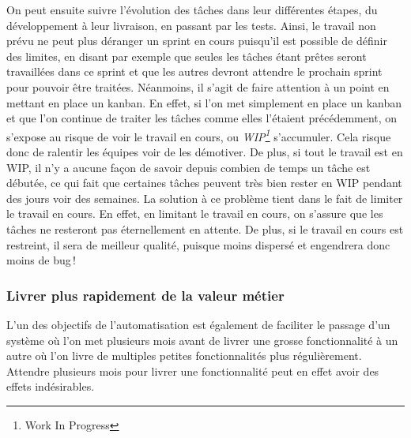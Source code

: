 On peut ensuite suivre l'évolution des tâches dans leur différentes étapes, du développement à leur livraison, en passant par les tests. Ainsi, le travail non prévu ne peut plus déranger un sprint en cours puisqu'il est possible de définir des limites, en disant par exemple que seules les tâches étant prêtes seront travaillées dans ce sprint et que les autres devront attendre le prochain sprint pour pouvoir être traitées. Néanmoins, il s'agit de faire attention à un point en mettant en place un kanban. En effet, si l'on met simplement en place un kanban et que l'on continue de traiter les tâches comme elles l'étaient précédemment, on s'expose au risque de voir le travail en cours, ou \emph{WIP\footnote{Work In Progress}} s'accumuler. Cela risque donc de ralentir les équipes voir de les démotiver. De plus, si tout le travail est en WIP, il n'y a aucune façon de savoir depuis combien de temps un tâche est débutée, ce qui fait que certaines tâches peuvent très bien rester en WIP pendant des jours voir des semaines. La solution à ce problème tient dans le fait de limiter le travail en cours. En effet, en limitant le travail en cours, on s'assure que les tâches ne resteront pas éternellement en attente. De plus, si le travail en cours est restreint, il sera de meilleur qualité, puisque moins dispersé et engendrera donc moins de bug !

\subsubsection{Livrer plus rapidement de la valeur métier}

L'un des objectifs de l'automatisation est également de faciliter le passage d'un système où l'on met plusieurs mois avant de livrer une grosse fonctionnalité à un autre où l'on livre de multiples petites fonctionnalités plus régulièrement. Attendre plusieurs mois pour livrer une fonctionnalité peut en effet avoir des effets indésirables.

